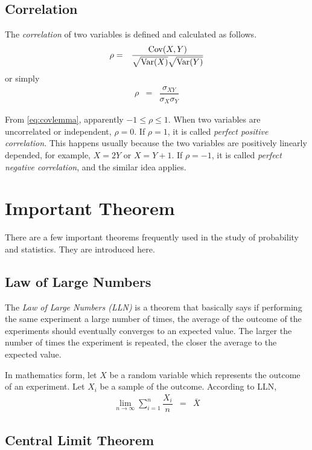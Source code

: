 \subsection{Correlation}

The \textit{correlation} of two variables is defined and calculated as follows.
\begin{eqnarray}
  \rho &=& \dfrac{\textup{Cov}(X, Y)}{\sqrt{\textup{Var}(X)}\sqrt{\textup{Var}(Y)}} \nonumber
\end{eqnarray}
or simply
\begin{eqnarray}
  \rho &=& \dfrac{\sigma_{XY}}{\sigma_X\sigma_Y} \nonumber
\end{eqnarray}

From \eqref{eq:covlemma}, apparently $-1\leq \rho \leq 1$. When two variables are uncorrelated or independent, $\rho=0$. If $\rho=1$, it is called \textit{perfect positive correlation}. This happens usually because the two variables are positively linearly depended, for example, $X=2Y$ or $X=Y+1$. If $\rho=-1$, it is called \textit{perfect negative correlation}, and the similar idea applies.

\section{Important Theorem}

There are a few important theorems frequently used in the study of probability and statistics. They are introduced here.

\subsection{Law of Large Numbers}

The \textit{Law of Large Numbers (LLN)} is a theorem that basically says if performing the same experiment a large number of times, the average of the outcome of the experiments should eventually converges to an expected value. The larger the number of times the experiment is repeated, the closer the average to the expected value.

In mathematics form, let $X$ be a random variable which represents the outcome of an experiment. Let $X_i$ be a sample of the outcome. According to LLN,
\begin{eqnarray}
  \lim_{n\rightarrow\infty} \sum_{i=1}^{n}\dfrac{X_i}{n} &=& \bar{X} \nonumber
\end{eqnarray}

\subsection{Central Limit Theorem}

